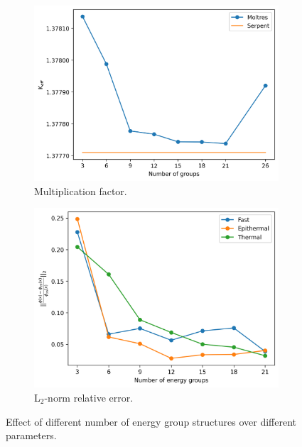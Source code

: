 \documentclass[11pt,letterpaper]{article}
\begin{document}
\begin{figure}[htbp!]
	\centering
	\begin{subfigure}[t]{0.4\textwidth}
		\centering
		\includegraphics[width=\linewidth]{figures/keff-noLBP-1200}
		\caption{Multiplication factor.}
	\end{subfigure}
	\begin{subfigure}[t]{0.4\textwidth}
		\centering
		\includegraphics[width=\linewidth]{figures/noLBP-1200-er-final}
		\caption{L$_2$-norm relative error.}
	\end{subfigure}
	\hfill
	\caption{Effect of different number of energy group structures over different parameters.}
	\label{fig:assembly-noLBP-1200}
\end{figure}
\end{document}
